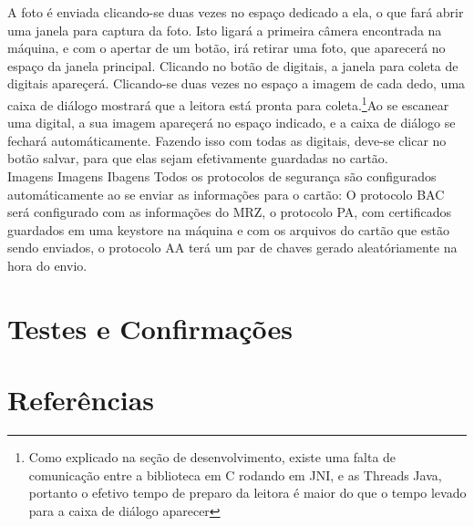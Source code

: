 \documentclass{article}
\begin{document}
\begin{justify}
				\hspace*{2cm} A foto é enviada clicando-se duas vezes no espaço dedicado a ela, o que fará abrir uma janela para captura da foto. Isto ligará a primeira câmera encontrada na máquina, e com o apertar de um botão, irá retirar uma foto, que aparecerá no espaço da janela principal. Clicando no botão de digitais, a janela para coleta de digitais apareçerá. Clicando-se duas vezes no espaço a imagem de cada dedo, uma caixa de diálogo mostrará que a leitora está pronta para coleta.\footnote{Como explicado na seção de desenvolvimento, existe uma falta de comunicação entre a biblioteca em C rodando em JNI, e as Threads Java, portanto o efetivo tempo de preparo da leitora é maior do que o tempo levado para a caixa de diálogo aparecer}Ao se escanear uma digital, a sua imagem apareçerá no espaço indicado, e a caixa de diálogo se fechará automáticamente. Fazendo isso com todas as digitais, deve-se clicar no botão salvar, para que elas sejam efetivamente guardadas no cartão.\\
				Imagens Imagens Ibagens
				\hspace*{2cm} Todos os protocolos de segurança são configurados automáticamente ao se enviar as informações para o cartão: O protocolo BAC será configurado com as informações do MRZ, o protocolo PA, com certificados guardados em uma keystore na máquina e com os arquivos do cartão que estão sendo enviados, o protocolo AA terá um par de chaves gerado aleatóriamente na hora do envio.
			
			\end{justify}

	\section{Testes e Confirmações}
		\begin{justify}
			
			
		\end{justify}

\begingroup
	\section{Referências}
		\renewcommand{\section}[2]{}
		
		\printbibliography		
		
\endgroup
\end{document}
